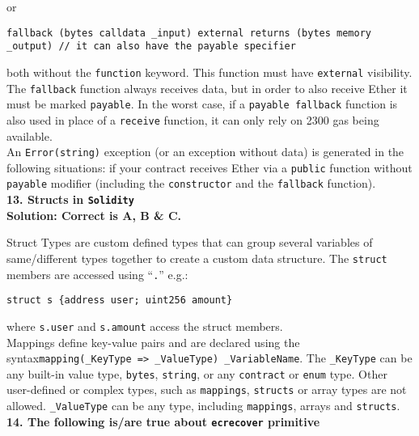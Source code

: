 or

\begin{lstlisting}[language=Solidity, style=solStyle]
fallback (bytes calldata _input) external returns (bytes memory _output) // it can also have the payable specifier
\end{lstlisting}

both without the \verb|function| keyword.
This function must have \verb|external| visibility.
The \verb|fallback| function always receives data, but in order to also receive Ether it must be marked \verb|payable|.
In the worst case, if a \verb|payable fallback| function is also used in place of a \verb|receive| function, it can only rely on 2300 gas being available.\\

An \verb|Error(string)| exception (or an exception without data) is generated in the following situations: if your contract receives Ether via a \verb|public| function without \verb|payable| modifier (including the \verb|constructor| and the \verb|fallback| function).\\

\textbf{13. Structs in \texttt{Solidity}}\label{sec:exam2_q13}\\

\textbf{Solution: Correct is A, B \& C.}

Struct Types are custom defined types that can group several variables of same/different types together to create a custom data structure.
The \verb|struct| members are accessed using ``\verb|.|'' e.g.:

\begin{lstlisting}[style=defaultStyle]
struct s {address user; uint256 amount}
\end{lstlisting}

where \verb|s.user| and \verb|s.amount| access the struct members.\\

Mappings define key-value pairs and are declared using the syntax\linebreak\verb|mapping(_KeyType => _ValueType) _VariableName|.
The \verb|_KeyType| can be any built-in value type, \verb|bytes|, \verb|string|, or any \verb|contract| or \verb|enum| type.
Other user-defined or complex types, such as \verb|mappings|, \verb|structs| or array types are not allowed.
\verb|_ValueType| can be any type, including \verb|mappings|, arrays and \verb|structs|.\\

\textbf{14. The following is/are true about \texttt{ecrecover} primitive}\label{sec:exam2_q14}\\

